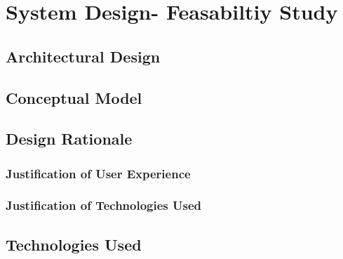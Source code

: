 \chapter{System Design- Feasabiltiy Study}

\section{Architectural Design}
\section{Conceptual Model}
\section{Design Rationale}

\subsection{Justification of User Experience}
\subsection{Justification of Technologies Used}
\section{Technologies Used}